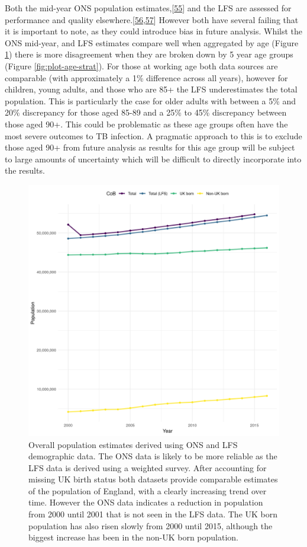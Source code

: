 \documentclass[11pt,twoside]{bristolthesis}
\begin{document}
  Both the mid-year ONS population estimates,{[}\protect\hyperlink{ref-storey2016}{55}{]} and the LFS are assessed for performance and quality elsewhere.{[}\protect\hyperlink{ref-NHSTraffordCCGGoverningBody2015}{56},\protect\hyperlink{ref-Date2012}{57}{]} However both have several failing that it is important to note, as they could introduce bias in future analysis. Whilst the ONS mid-year, and LFS estimates compare well when aggregated by age (Figure \ref{fig:plot-overall-pop}) there is more disagreement when they are broken down by 5 year age groups (Figure \ref{fig:plot-age-strat}). For those at working age both data sources are comparable (with approximately a 1\% difference across all years), however for children, young adults, and those who are 85+ the LFS underestimates the total population. This is particularly the case for older adults with between a 5\% and 20\% discrepancy for those aged 85-89 and a 25\% to 45\% discrepancy between those aged 90+. This could be problematic as these age groups often have the most severe outcomes to TB infection. A pragmatic approach to this is to exclude those aged 90+ from future analysis as results for this age group will be subject to large amounts of uncertainty which will be difficult to directly incorporate into the results.
  \begin{figure}
  
  {\centering \includegraphics[width=0.8\linewidth,]{chapters/tb-epi-england/figures/plot-overall-pop} 
  
  }
  
  \caption[Overall population estimates derived using ONS and LFS demographic data.]{Overall population estimates derived using ONS and LFS demographic data. The ONS data is likely to be more reliable as the LFS data is derived using a weighted survey. After accounting for missing UK birth status both datasets provide comparable estimates of the population of England, with a clearly increasing trend over time. However the ONS data indicates a reduction in population from 2000 until 2001 that is not seen in the LFS data. The UK born population has also risen slowly from 2000 until 2015, although the biggest increase has been in the non-UK born population.}\label{fig:plot-overall-pop}
  \end{figure}
\end{document}

